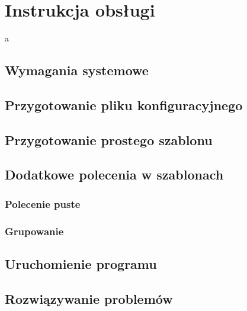 \chapter{Instrukcja obsługi}
a
\section{Wymagania systemowe}
\section{Przygotowanie pliku konfiguracyjnego}
\section{Przygotowanie prostego szablonu}
\section{Dodatkowe polecenia w szablonach}
\subsection{Polecenie puste}
\subsection{Grupowanie}
\section{Uruchomienie programu}
\section{Rozwiązywanie problemów}
